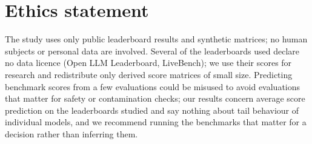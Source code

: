 \section*{Ethics statement}
The study uses only public leaderboard results and synthetic matrices; no human subjects or personal data are involved. Several of the leaderboards used declare no data licence (Open LLM Leaderboard, LiveBench); we use their scores for research and redistribute only derived score matrices of small size. Predicting benchmark scores from a few evaluations could be misused to avoid evaluations that matter for safety or contamination checks; our results concern average score prediction on the leaderboards studied and say nothing about tail behaviour of individual models, and we recommend running the benchmarks that matter for a decision rather than inferring them.
